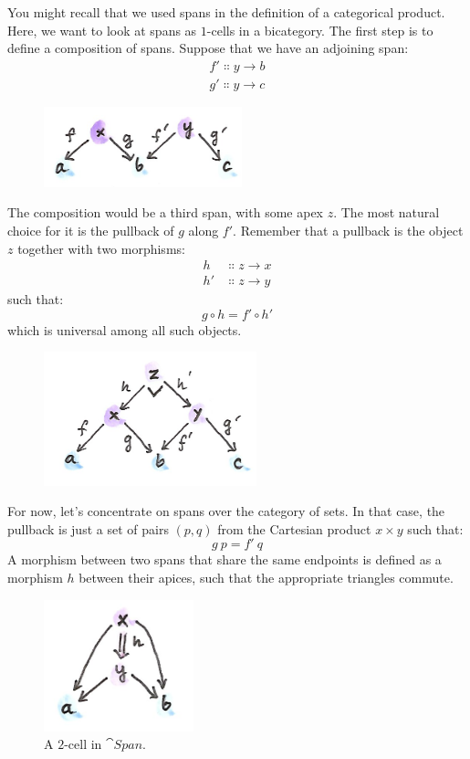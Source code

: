 \noindent
You might recall that we used spans in the definition of a categorical
product. Here, we want to look at spans as $1$-cells in a bicategory. The
first step is to define a composition of spans. Suppose that we have an
adjoining span:
\begin{gather*}
f' \Colon y \to b \\
g' \Colon y \to c
\end{gather*}

\begin{figure}[H]
\centering
\includegraphics[width=2.26042in]{images/compspan.png}
\end{figure}

\noindent
The composition would be a third span, with some apex $z$. The
most natural choice for it is the pullback of $g$ along
$f'$. Remember that a pullback is the object $z$
together with two morphisms:
\begin{align*}
h &\Colon z \to x \\
h' &\Colon z \to y
\end{align*}
such that:
\[g \circ h = f' \circ h'\]
which is universal among all such objects.

\begin{figure}[H]
\centering
\includegraphics[width=2.42708in]{images/pullspan.png}\\
\end{figure}

\noindent
For now, let's concentrate on spans over the category of sets. In that
case, the pullback is just a set of pairs $(p, q)$ from the
Cartesian product $x \times y$ such that:
\[g\ p = f'\ q\]
A morphism between two spans that share the same endpoints is defined as
a morphism $h$ between their apices, such that the appropriate
triangles commute.

\begin{figure}[H]
\centering
\includegraphics[width=1.70833in]{images/morphspan.png}
\caption{A $2$-cell in $\cat{Span}$.}
\end{figure}

